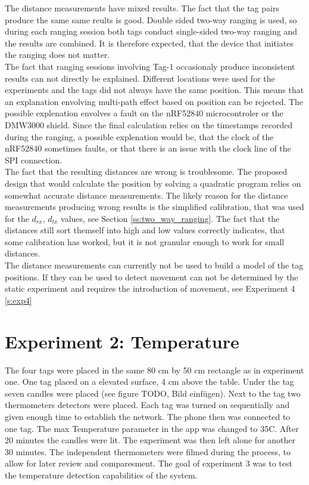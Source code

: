 The distance measurements have mixed results.
The fact that the tag pairs produce the same same reults is good.
Double sided two-way ranging is used, so during each ranging session both tags conduct single-sided two-way ranging and the results are combined.
It is therefore expected, that the device that initiates the ranging does not matter.\\
The fact that ranging sessions involving Tag-1 occasionaly produce inconsistent results can not directly be explained.
Different locations were used for the experiments and the tags did not always have the same position.
This means that an explanation envolving multi-path effect based on position can be rejected.
The possible explenation envolves a fault on the nRF52840 microcontroler or the DMW3000 shield. 
Since the final calculation relies on the timestamps recorded during the ranging, a possible explenation would be, that the clock of the nRF52840 sometimes faults, or that there is an issue with the clock line of the SPI connection.\\
The fact that the resulting distances are wrong is troublesome.
The proposed design that would calculate the position by solving a quadratic program relies on somewhat accurate distance measurements.
The likely reason for the distance measurements producing wrong results is the simplified calibration, that was used for the $d_{rx}$, $d_{tx}$ values, see Section \ref{ss:two_way_ranging}.
The fact that the distances still sort themself into high and low values correctly indicates, that some calibration has worked, but it is not granular enough to work for small distances.\\
The distance measurements can currently not be used to build a model of the tag positions.
If they can be used to detect movement can not be determined by the static experiment and requires the introduction of movement, see Experiment 4 \ref{s:exp4}


\section{Experiment 2: Temperature}
\label{ss:exp_2}
The four tags were placed in the same 80 cm by 50 cm rectangle as in experiment one.
One tag placed on a elevated surface, 4 cm above the table.
Under the tag seven candles were placed (see figure TODO, Bild einfügen).
Next to the tag two thermometers detectors were placed.
Each tag was turned on sequentially and given enough time to establish the network.
The phone then was connected to one tag.
The max Temperature parameter in the app was changed to 35\degree C.
After 20 minutes the candles were lit.
The experiment was then left alone for another 30 minutes.
The independent thermometers were filmed during the process, to allow for later review and comparesment.
The goal of experiment 3 was to test the temperature detection capabilities of the system.

